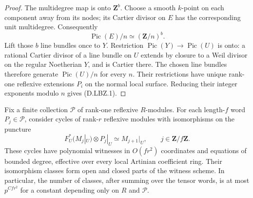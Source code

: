 \begin{proof}
The multidegree map is onto $\mathbf Z^b$.  Choose a
smooth $k$-point on each component away from its nodes;
its Cartier divisor on $E$ has the corresponding
unit multidegree.  Consequently
\[
                      \operatorname{Pic}(E)/n
                                  \simeq(\mathbf Z/n)^b.
                                                        \tag{D.LBZ.5}
\]
Lift those $b$ line bundles once to $Y$.
Restriction $\operatorname{Pic}(Y)\to\operatorname{Pic}(U)$
is onto: a rational Cartier divisor of a line bundle
on $U$ extends by closure to a Weil divisor on the
regular Noetherian $Y$, and is Cartier there.
The chosen line bundles therefore generate
$\operatorname{Pic}(U)/n$ for every $n$.
Their restrictions have unique rank-one reflexive
extensions $P_i$ on the normal local surface.
Reducing their integer exponents modulo $n$ gives
(D.LBZ.1).
\end{proof}

\begin{proposition}
\label{D:local-fixed-tensor-cyclic-atlas}
Fix a finite collection $\mathscr P$ of rank-one reflexive
$R$-modules.  For each length-$f$ word $P_j\in\mathscr P$,
consider cycles of rank-$r$ reflexive modules with
isomorphisms on the puncture
\[
       F_U^*(M_j|_U)\otimes P_j|_U
                             \simeq M_{j+1}|_U,
                \qquad j\in\mathbf Z/f\mathbf Z.          \tag{D.LBZ.6}
\]
These cycles have polynomial witnesses in $O(fr^2)$
coordinates and equations of bounded degree, effective
over every local Artinian coefficient ring.
Their isomorphism classes form open and closed parts
of the witness scheme.  In particular, the number
of classes, after summing over the tensor words, is
at most $p^{Cfr^2}$ for a constant depending only on
$R$ and $\mathscr P$.
\end{proposition}

